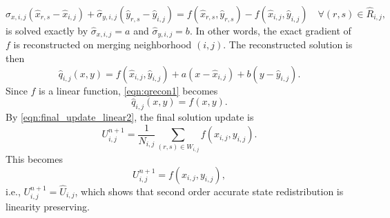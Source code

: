 \begin{equation}
\widehat{\sigma}_{x,i,j}(\widehat{x}_{r,s} - \widehat{x}_{i,j}) + \widehat{\sigma}_{y,i,j}(\widehat{y}_{r,s} - \widehat{y}_{i,j})= f(\widehat{x}_{r,s}, \widehat{y}_{r,s}) - f(\widehat{x}_{i,j}, \widehat{y}_{i,j}) \quad \forall (r,s) \in \widehat{R}_{i,j},
\end{equation}
is solved exactly by $\widehat{\sigma}_{x,i,j}=a$ and
$\widehat{\sigma}_{y,i,j}=b$.  In other words, the exact gradient 
of $f$ is reconstructed on merging neighborhood $(i,j)$.  
The reconstructed solution is then
\begin{equation}
    \label{eqn:qrecon1}
    \hat{q}_{i,j}(x,y) = f(\widehat{x}_{i,j},\widehat{y}_{i,j}) + a(x-\widehat{x}_{i,j})+b(y-\widehat{y}_{i,j}) .
\end{equation}
Since $f$ is a linear function, \eqref{eqn:qrecon1} becomes
\begin{equation}
    \label{eqn:qrecon2}
    \hat{q}_{i,j}(x,y) = f(x,y).
\end{equation}
By \eqref{eqn:final_update_linear2}, the final solution update is
\begin{equation} 
U^{n+1}_{i,j} = \frac{1}{N_{i,j}}\sum_{(r,s) \in W_{i,j}}f(x_{i,j},y_{i,j}).
\end{equation}
This becomes
\begin{equation} 
U^{n+1}_{i,j} = f(x_{i,j},y_{i,j}),
\end{equation}
i.e., $U^{n+1}_{i,j} = \widehat{U}_{i,j}$, which shows that second order accurate state redistribution is linearity preserving.






